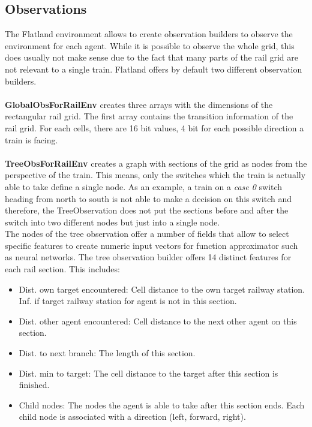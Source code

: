 \subsection*{Observations}\label{observations}
The Flatland environment allows to create observation builders to observe the environment for each agent. While it is possible to observe the whole grid, this does usually not make sense due to the fact that many parts of the rail grid are not relevant to a single train. Flatland offers by default two different observation builders.\\\\
\textbf{GlobalObsForRailEnv} creates three arrays with the dimensions of the rectangular rail grid. The first array contains the transition information of the rail grid. For each cells, there are 16 bit values, 4 bit for each possible direction a train is facing.\\\\
\textbf{TreeObsForRailEnv} creates a graph with sections of the grid as nodes from the perspective of the train.
This means, only the switches which the train is actually able to take define a single node. As an example, a train on a \textit{case 0} switch heading from north to south is not able to make a decision on this switch and therefore, the TreeObservation does not put the sections before and after the switch into two different nodes but just into a single node.\\
The nodes of the tree observation offer a number of fields that allow to select specific features to create numeric input vectors for function approximator such as neural networks. The tree observation builder offers 14 distinct features for each rail section. This includes:
\begin{itemize}
	\item Dist. own target encountered: Cell distance to the own target railway station. Inf. if target railway station for agent is not in this section.
	\item Dist. other agent encountered: Cell distance to the next other agent on this section.
	\item Dist. to next branch: The length of this section.
	\item Dist. min to target: The cell distance to the target after this section is finished.
	\item Child nodes: The nodes the agent is able to take after this section ends. Each child node is associated with a direction (left, forward, right).
\end{itemize}

